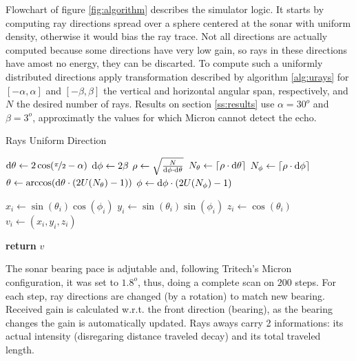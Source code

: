 Flowchart of figure \ref{fig:algorithm} describes the simulator logic. It starts
by computing ray directions spread over a sphere centered at the sonar with
uniform density, otherwise it would bias the ray trace. Not all directions are
actually computed because some directions have very low gain, so rays in these directions
have amost no energy, they can be discarted. To compute such a uniformly
distributed directions apply transformation described by algorithm
\ref{alg:urays} for $[-\alpha,\alpha]$ and $[-\beta,\beta]$ the vertical and
horizontal angular span, respectively, and $N$ the desired number of rays.
Results on section \ref{ss:results} use $\alpha = 30^o$ and $\beta = 3^o$,
approximatly the values for which Micron cannot detect the echo. 


\begin{algorithm}
\caption{Rays Uniform Direction}
\label{alg:urays}
\begin{algorithmic}

\State $\mathrm{d}\theta \gets 2\cos(\nicefrac{\pi}{2}-\alpha)$
\State $\mathrm{d}\phi \gets 2\beta $
\State $\rho \gets \sqrt{\frac{N}{\mathrm{d}\phi\cdot\mathrm{d}\theta}}$ 
\State $N_\theta \gets \lceil\rho\cdot\mathrm{d}\theta\rceil$
\State $N_\phi \gets \lceil\rho\cdot\mathrm{d}\phi\rceil$
\State $\theta \gets \arccos(\mathrm{d}\theta\cdot (2U(N_\theta)-1))$ 
\State $\phi \gets \mathrm{d}\phi\cdot (2U(N_\phi)-1)$

\State $x_i \gets \sin(\theta_i)\cos(\phi_i)$
\State $y_i \gets \sin(\theta_i)\sin(\phi_i)$
\State $z_i \gets \cos(\theta_i)$
\State $v_i \gets (x_i,y_i,z_i)$
\EndFor

\State \textbf{return} $v$
\EndProcedure
\end{algorithmic}
\end{algorithm}

The sonar bearing pace is adjutable and, following Tritech's Micron
configuration, it was set to $1.8^o$, thus, doing a complete scan on $200$ steps. For each step, ray
directions are changed (by a rotation) to match new bearing. Received gain is
calculated w.r.t. the front direction (bearing), as the bearing changes the gain
is automatically updated. Rays aways carry 2 informations: its actual
intensity (disregaring distance traveled decay) and its total traveled length.

